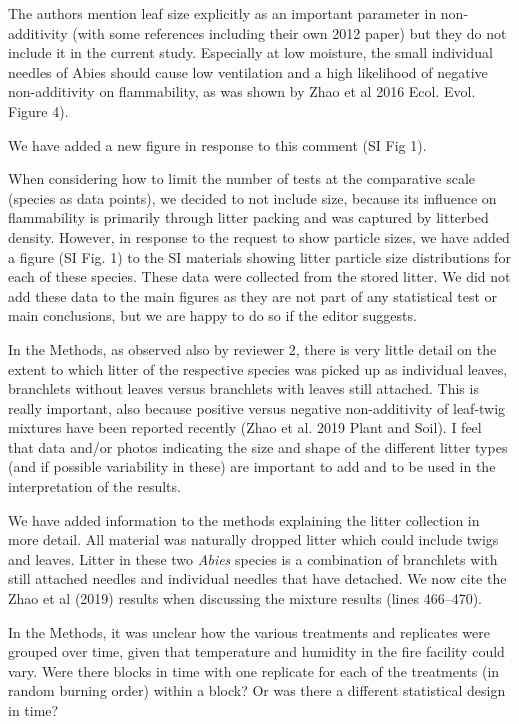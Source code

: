 \documentclass[letterpaper, 12pt]{letter}
\begin{document}
\begin{letter}{}
\begin{quoting}
  The authors mention leaf size explicitly as an important parameter in
  non-additivity (with some references including their own 2012 paper) but they
  do not include it in the current study. Especially at low moisture, the small
  individual needles of Abies should cause low ventilation and a high
  likelihood of negative non-additivity on flammability, as was shown by Zhao
  et al 2016 Ecol. Evol. Figure 4).
\end{quoting}

We have added a new figure in response to this comment (SI Fig 1).

When considering how to limit the number of tests at the comparative scale
(species as data points), we decided to not include size, because its influence
on flammability is primarily through litter packing and was captured by
litterbed density. However, in response to the request to show particle sizes,
we have added a figure (SI Fig. 1) to the SI materials showing litter particle
size distributions for each of these species. These data were collected from
the stored litter. We did not add these data to the main figures as they are
not part of any statistical test or main conclusions, but we are happy to do so
if the editor suggests.


\begin{quoting}
  In the Methods, as observed also by reviewer 2, there is very little detail
  on the extent to which litter of the respective species was picked up as
  individual leaves, branchlets without leaves versus branchlets with leaves
  still attached. This is really important, also because positive versus
  negative non-additivity of leaf-twig mixtures have been reported recently
  (Zhao et al. 2019 Plant and Soil). I feel that data and/or photos indicating
  the size and shape of the different litter types (and if possible variability
  in these) are important to add and to be used in the interpretation of the
  results.
\end{quoting}

We have added information to the methods explaining the litter collection in
more detail. All material was naturally dropped litter which could include
twigs and leaves. Litter in these two \emph{Abies} species is a combination of
branchlets with still attached needles and individual needles that have
detached. We now cite the Zhao et al (2019) results when discussing the mixture
results (lines 466--470).

\begin{quoting}
  In the Methods, it was unclear how the various treatments and replicates were
  grouped over time, given that temperature and humidity in the fire facility
  could vary. Were there blocks in time with one replicate for each of the
  treatments (in random burning order) within a block? Or was there a different
  statistical design in time?
\end{quoting}


\end{letter}
\end{document}
